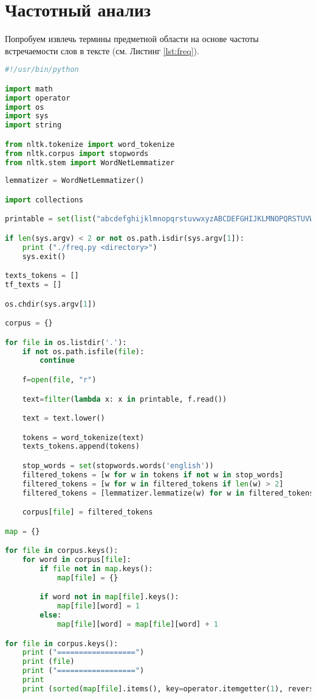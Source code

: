\documentclass[12pt, a4paper] {article}
\begin{document}
\section{Частотный анализ}
Попробуем извлечь термины предметной области на основе частоты встречаемости
слов в тексте (см. Листинг \ref{lst:freq}).
\begin{lstlisting}[language=Python,caption=Исходный код частотного анализатора,label=lst:freq]
#!/usr/bin/python

import math
import operator
import os
import sys
import string

from nltk.tokenize import word_tokenize
from nltk.corpus import stopwords
from nltk.stem import WordNetLemmatizer 
  
lemmatizer = WordNetLemmatizer() 

import collections

printable = set(list("abcdefghijklmnopqrstuvwxyzABCDEFGHIJKLMNOPQRSTUVWXYZ "))

if len(sys.argv) < 2 or not os.path.isdir(sys.argv[1]):
    print ("./freq.py <directory>")
    sys.exit()

texts_tokens = []
tf_texts = []

os.chdir(sys.argv[1])

corpus = {}

for file in os.listdir('.'):
    if not os.path.isfile(file):
        continue

    f=open(file, "r")

    text=filter(lambda x: x in printable, f.read())

    text = text.lower()

    tokens = word_tokenize(text)
    texts_tokens.append(tokens)

    stop_words = set(stopwords.words('english'))
    filtered_tokens = [w for w in tokens if not w in stop_words] 
    filtered_tokens = [w for w in filtered_tokens if len(w) > 2]
    filtered_tokens = [lemmatizer.lemmatize(w) for w in filtered_tokens]

    corpus[file] = filtered_tokens

map = {}

for file in corpus.keys():
    for word in corpus[file]:
        if file not in map.keys():
            map[file] = {}

        if word not in map[file].keys():
            map[file][word] = 1
        else:
            map[file][word] = map[file][word] + 1

for file in corpus.keys():
    print ("==================")
    print (file)
    print ("==================")
    print
    print (sorted(map[file].items(), key=operator.itemgetter(1), reverse=True)[:30])
\end{lstlisting}
\end{document}

